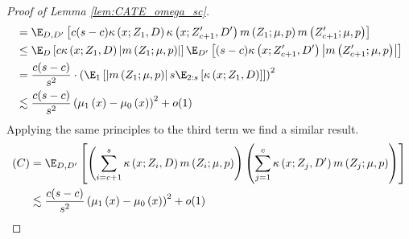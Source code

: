 \begin{proof}[Proof of Lemma \ref{lem:CATE_omega_sc}]
\begin{equation}
\begin{aligned}
			& = \E_{D, D^{\prime}}\left[c (s-c) \kappa\left(x; Z_{1}, D\right)\kappa\left(x; Z_{c+1}^{\prime}, D^{\prime}\right) m\left(Z_{1}; \mu, p\right) m\left(Z_{c+1}^{\prime}; \mu, p\right)\right]\\
			& \leq \E_{D}\left[c \kappa\left(x; Z_{1}, D\right)  \left|m\left(Z_{1}; \mu, p\right)\right|\right]
			\E_{D^{\prime}}\left[(s-c) \kappa\left(x; Z_{c+1}^{\prime}, D^{\prime}\right)  \left| m\left(Z_{c+1}^{\prime}; \mu, p\right) \right|\right]\\
			& = \frac{c(s-c)}{s^2} \cdot \left(\E_{1}\left[\left|m\left(Z_{1}; \mu, p\right)\right| s \E_{2:s}\left[\kappa\left(x; Z_{1}, D\right)\right]\right]\right)^2\\
			& \lesssim \frac{c(s-c)}{s^2}\left(\mu_{1}\left(x\right) - \mu_{0}\left(x\right)\right)^2  + o(1)
		\end{aligned}
	\end{equation}
	Applying the same principles to the third term we find a similar result.
	\begin{equation}
		\begin{aligned}
			(C)
			& = \E_{D, D^{\prime}}\left[\left(\sum_{i = c + 1}^{s} \kappa\left(x; Z_{i}, D\right) m\left(Z_{i}; \mu, p\right)\right)
            \left(\sum_{j = 1}^{c} \kappa\left(x; Z_{j}, D^{\prime}\right) m\left(Z_{j}; \mu, p\right)\right)\right]\\
			& \lesssim \frac{c(s-c)}{s^2}\left(\mu_{1}\left(x\right) - \mu_{0}\left(x\right)\right)^2  + o(1)
		\end{aligned}

\end{equation}
\end{proof}
